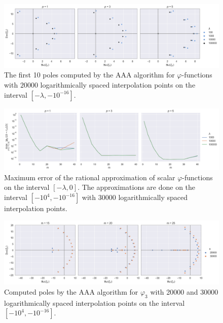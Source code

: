 \begin{figure}[h!]
    \centering
    \includegraphics[width=.9\textwidth]{img/AAA/poles_lambda_log20k_m10.png}
    \caption{
        The first 10 poles computed by the AAA algorithm for $\varphi$-functions with $20000$
        logarithmically spaced interpolation points on the interval $[-\lambda, -10^{-16}]$.
    }
    \label{fig:polesAAA}
\end{figure}

\begin{figure}[h!]
    \centering
    \includegraphics[width=.9\textwidth]{img/AAA/errors_ms_log30k.png}
    \caption{
        Maximum error of the rational approximation of scalar $\varphi$-functions
        on the interval $[-\lambda, 0]$.
        The approximations are done on the interval $[-10^4, -10^{-16}]$ with $30000$
        logarithmically spaced interpolation points.
    }
    \label{fig:errorsAAAms}
\end{figure}

\begin{figure}[h!]
    \centering
    \includegraphics[width=.9\textwidth]{img/AAA/poles_ms_log_p03.png}
    \caption{
        Computed poles by the AAA algorithm for $\varphi_3$ with 20000 and 30000
        logarithmically spaced interpolation points on the interval $[-10^{4}, -10^{-16}]$.
    }
    \label{fig:polesAAAms}
\end{figure}


